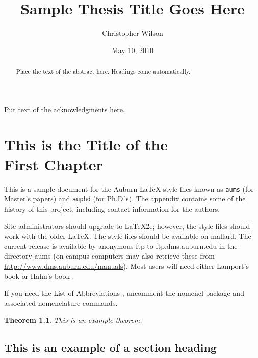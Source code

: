 \documentclass[12pt]{report}
\title{Sample Thesis Title Goes Here}
\author{Christopher Wilson}
\date{May 10, 2010} %
\newtheorem{theorem}{Theorem}[chapter]
\begin{document}
\begin{romanpages}      %

\TitlePage 

\begin{abstract} 
Place the text of the abstract here. Headings come automatically.
\end{abstract}

\begin{acknowledgments}
Put text of the acknowledgments here.
\end{acknowledgments}

\tableofcontents
\listoffigures
\listoftables

\printnomenclature[0.5in] %
\end{romanpages}        %


\normalem       %


\chapter{This is the Title of the\\ First Chapter}  %

This is a sample document for the Auburn  \LaTeX{} style-files known
as {\tt aums} (for Master's papers) and {\tt auphd} (for Ph.D.'s).
The appendix contains some of the history of this project, including
contact information for the authors. 

Site administrators should upgrade to \LaTeX2e; however, the style files
should work with the older \LaTeX.  The style files should be available
on mallard.  The current release is available by anonymous ftp to
ftp.dms.auburn.edu in the directory aums (on-campus computers may
also retrieve these from \url{http://www.dms.auburn.edu/manuals}).
Most users will need either Lamport's book \cite{lamport} or Hahn's book
\cite{hahn}.

If you need the List of Abbreviations , uncomment the nomencl package and associated nomenclature commands. 
\begin{theorem} This is an example theorem.
\end{theorem}

\section{This is an example of a section heading}
\end{document}
